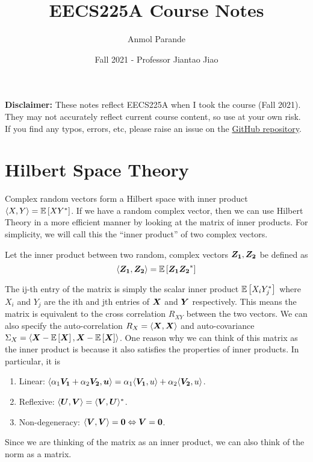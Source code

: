 

\title{EECS225A Course Notes}
\author{Anmol Parande}
\date{Fall 2021 - Professor Jiantao Jiao}
\maketitle
\textbf{Disclaimer: }These notes reflect EECS225A when I took the course (Fall 2021). They may not accurately reflect current course content, so use at your own risk.
If you find any typos, errors, etc, please raise an issue on the \href{https://github.com/parandea17/BerkeleyNotes}{GitHub repository}.
\tableofcontents
\newpage
\section{Hilbert Space Theory}
Complex random vectors form a Hilbert space with inner product $\langle X, Y \rangle = \mathbb{E}\left[XY^*\right]$.
If we have a random complex vector, then we can use Hilbert Theory in a more efficient manner by looking at the matrix of inner products.
For simplicity, we will call this the ``inner product'' of two complex vectors.
\begin{definition}
	Let the inner product between two random, complex vectors $\boldsymbol{Z_1}, \boldsymbol{Z_2}$ be defined as \[
		\langle \boldsymbol{Z_1}, \boldsymbol{Z_2} \rangle = \mathbb{E}\left[\boldsymbol{Z_1}\boldsymbol{Z_2}^*\right]
	\]
	\label{defn:inner-product}
\end{definition}
The ij-th entry of the matrix is simply the scalar inner product $\mathbb{E}\left[X_iY_j^*\right]$ where $X_i$ and $Y_j$ are the ith and jth entries of $\boldsymbol{X}$ and $\boldsymbol{Y}$ respectively.
This means the matrix is equivalent to the cross correlation $R_{XY}$ between the two vectors.
We can also specify the auto-correlation $R_X = \langle \boldsymbol{X}, \boldsymbol{X} \rangle$ and auto-covariance $\Sigma_X = \langle \boldsymbol{X} - \mathbb{E}\left[\boldsymbol{X}\right], \boldsymbol{X} - \mathbb{E}\left[\boldsymbol{X}\right] \rangle$.
One reason why we can think of this matrix as the inner product is because it also satisfies the properties of inner products.
In particular, it is
\begin{enumerate}
	\item Linear: $\langle \alpha_1\boldsymbol{V_1}+\alpha_2\boldsymbol{V_2}, \boldsymbol{u} \rangle = \alpha_1\langle \boldsymbol{V_1}, u \rangle + \alpha_2\langle \boldsymbol{V_2}, u \rangle$.
	\item Reflexive: $\langle \boldsymbol{U}, \boldsymbol{V} \rangle = \langle \boldsymbol{V}, \boldsymbol{U} \rangle^*$.
	\item Non-degeneracy: $\langle \boldsymbol{V}, \boldsymbol{V} \rangle = \boldsymbol{0} \Leftrightarrow \boldsymbol{V} = \boldsymbol{0}$.
\end{enumerate}
Since we are thinking of the matrix as an inner product, we can also think of the norm as a matrix.
